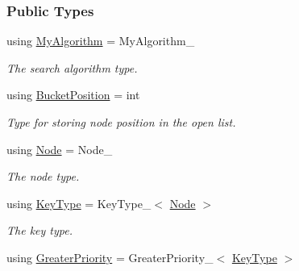 \subsubsection*{Public Types}
\begin{DoxyCompactItemize}
\item 
using \hyperlink{structopenList_1_1BucketedStdMap__T_a40b0529a53dfea9e6a9c5c7944ee5b62}{My\+Algorithm} = My\+Algorithm\+\_\+\hypertarget{structopenList_1_1BucketedStdMap__T_a40b0529a53dfea9e6a9c5c7944ee5b62}{}\label{structopenList_1_1BucketedStdMap__T_a40b0529a53dfea9e6a9c5c7944ee5b62}

\begin{DoxyCompactList}\small\item\em The search algorithm type. \end{DoxyCompactList}\item 
using \hyperlink{structopenList_1_1BucketedStdMap__T_ac156e6ef0cd1b8435c2312fcd58b69e7}{Bucket\+Position} = int\hypertarget{structopenList_1_1BucketedStdMap__T_ac156e6ef0cd1b8435c2312fcd58b69e7}{}\label{structopenList_1_1BucketedStdMap__T_ac156e6ef0cd1b8435c2312fcd58b69e7}

\begin{DoxyCompactList}\small\item\em Type for storing node position in the open list. \end{DoxyCompactList}\item 
using \hyperlink{structopenList_1_1BucketedStdMap__T_a54e9b34cd8d421140da4db26b700f5d6}{Node} = Node\+\_\+\hypertarget{structopenList_1_1BucketedStdMap__T_a54e9b34cd8d421140da4db26b700f5d6}{}\label{structopenList_1_1BucketedStdMap__T_a54e9b34cd8d421140da4db26b700f5d6}

\begin{DoxyCompactList}\small\item\em The node type. \end{DoxyCompactList}\item 
using \hyperlink{structopenList_1_1BucketedStdMap__T_a307af8874eba4b74cfd21f73a335bf0c}{Key\+Type} = Key\+Type\+\_\+$<$ \hyperlink{structopenList_1_1BucketedStdMap__T_a54e9b34cd8d421140da4db26b700f5d6}{Node} $>$\hypertarget{structopenList_1_1BucketedStdMap__T_a307af8874eba4b74cfd21f73a335bf0c}{}\label{structopenList_1_1BucketedStdMap__T_a307af8874eba4b74cfd21f73a335bf0c}

\begin{DoxyCompactList}\small\item\em The key type. \end{DoxyCompactList}\item 
using \hyperlink{structopenList_1_1BucketedStdMap__T_ac76eb839750868a5c06e371a905a2857}{Greater\+Priority} = Greater\+Priority\+\_\+$<$ \hyperlink{structopenList_1_1BucketedStdMap__T_a307af8874eba4b74cfd21f73a335bf0c}{Key\+Type} $>$\hypertarget{structopenList_1_1BucketedStdMap__T_ac76eb839750868a5c06e371a905a2857}{}\label{structopenList_1_1BucketedStdMap__T_ac76eb839750868a5c06e371a905a2857}


\end{DoxyCompactItemize}
